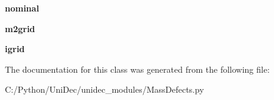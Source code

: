 \begin{DoxyCompactItemize}
\item 
\hypertarget{class_uni_dec_1_1unidec__modules_1_1_mass_defects_1_1_mass_defect_window_ae3012266882f83eb505ab4169a15475f}{}{\bfseries nominal}\label{class_uni_dec_1_1unidec__modules_1_1_mass_defects_1_1_mass_defect_window_ae3012266882f83eb505ab4169a15475f}

\item 
\hypertarget{class_uni_dec_1_1unidec__modules_1_1_mass_defects_1_1_mass_defect_window_ad49c782f7c6da5e1d7757275e422ba18}{}{\bfseries m2grid}\label{class_uni_dec_1_1unidec__modules_1_1_mass_defects_1_1_mass_defect_window_ad49c782f7c6da5e1d7757275e422ba18}

\item 
\hypertarget{class_uni_dec_1_1unidec__modules_1_1_mass_defects_1_1_mass_defect_window_ab1f65ba6e64052a2b4a68b5df2056778}{}{\bfseries igrid}\label{class_uni_dec_1_1unidec__modules_1_1_mass_defects_1_1_mass_defect_window_ab1f65ba6e64052a2b4a68b5df2056778}

\end{DoxyCompactItemize}


The documentation for this class was generated from the following file\+:\begin{DoxyCompactItemize}
\item 
C\+:/\+Python/\+Uni\+Dec/unidec\+\_\+modules/Mass\+Defects.\+py\end{DoxyCompactItemize}
